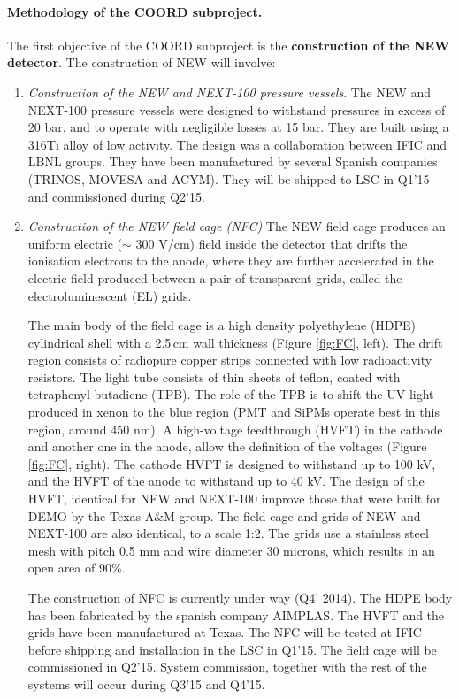 \paragraph{Methodology of the COORD subproject.}

The first objective of the COORD subproject is the {\bf construction of the NEW detector}. The construction of NEW will involve:

\begin{enumerate}
\item {\em Construction of the NEW and NEXT-100 pressure vessels}.
The NEW and NEXT-100 pressure vessels were designed to withstand pressures in excess of 20 bar, and to operate with negligible losses at 15 bar. They are built using a 316Ti alloy of low activity. 
The design was a collaboration between IFIC and LBNL groups. They have been manufactured by several Spanish companies (TRINOS, MOVESA and ACYM). They will be shipped to LSC in Q1'15 and commissioned during Q2'15. 

\item {\em Construction of the NEW field cage (NFC)}
The NEW field cage produces an uniform electric ($\sim$ 300 V/cm) field inside the  detector that drifts the ionisation electrons to the anode, where they are further accelerated in the electric field produced between a pair of transparent grids, called the electroluminescent (EL) grids. 

The main body of the field cage is a high density polyethylene (HDPE) cylindrical shell with a 2.5\,cm wall thickness (Figure \ref{fig:FC}, left).  The drift region consists of radiopure  copper strips connected with low radioactivity resistors.  The light tube consists of thin sheets of teflon, coated with tetraphenyl butadiene (TPB). The role of the TPB is to shift the UV light produced in xenon to the blue region (PMT and SiPMs operate best in this region, around 450 nm).  A high-voltage feedthrough (HVFT) in the cathode and another one in the anode, allow the definition of the voltages (Figure \ref{fig:FC}, right). The cathode HVFT is designed to withstand up to 100 kV, and the HVFT of the anode to withstand up to 40 kV. The design of the HVFT, identical for NEW and NEXT-100 improve those that were built for DEMO by the Texas A\&M group. The field cage and grids of NEW and NEXT-100 are also identical, to a scale 1:2. The grids use a stainless steel mesh with pitch 0.5 mm and wire diameter 30 microns, which results in an open area of 90\%. 

The construction of NFC is currently under way (Q4' 2014). The HDPE body has been fabricated by the spanish company AIMPLAS. The HVFT and the grids have been manufactured at Texas. The  NFC will be tested at IFIC before shipping and installation in the LSC in Q1'15. The field cage will be commissioned in Q2'15. System commission, together with the rest of the systems will occur during Q3'15 and Q4'15.


\end{enumerate}
